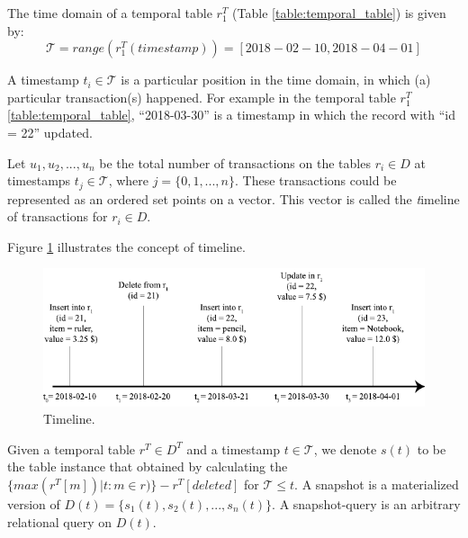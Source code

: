 		\begin{example}
			The time domain of a temporal table $r_1^T$ (Table \ref{table:temporal_table}) is given by:
			$$\mathcal{T} = range(r_1^T(timestamp)) = [2018-02-10, 2018-04-01]$$
		\label{example:time_domain}
		\end{example}
		\begin{defn}[Timestamps]
			A timestamp $t_i \in \mathcal{T}$ is a particular position in the time domain, in which (a) particular transaction(s) happened. For example in the temporal table $r_1^T$ \ref{table:temporal_table}, ``2018-03-30'' is a timestamp in which the record with ``id = 22'' updated.
		\label{dfn:timestamp}
		\end{defn}
		\begin{defn}[Timeline]
			Let $u_1,u_2,...,u_n$ be the total number of transactions on the tables $r_i \in D$ at timestamps $t_j \in \mathcal{T}$, where $j=\{0,1,...,n\}$. These transactions could be represented as an ordered set points on a vector. This vector is called the {\textit timeline of transactions} for $r_i \in D$.
		\label{dfn:timeline}
		\end{defn}
		Figure \ref{fig:timeline} illustrates the concept of timeline.

		\begin{figure}
			\centering
			\includegraphics[width=\textwidth]{figs/timeline.pdf}
			\caption{Timeline.}
			\label{fig:timeline}
		\end{figure}

		\begin{defn} 
			Given a temporal table $r^T \in D^T$ and a timestamp $t \in \mathcal{T}$, we denote $s(t)$ to be the table instance that obtained by calculating the $\{max(r^T[m])|t : m\in r)\}-r^T[deleted]$ for $\mathcal{T}\leq t$. A snapshot is a materialized version of $D(t) = \{s_1(t),s_2(t),...,s_n(t)\}$. A snapshot-query is an arbitrary relational query on $D(t)$.
		\label{dfn:snapshot}
		\end{defn}


